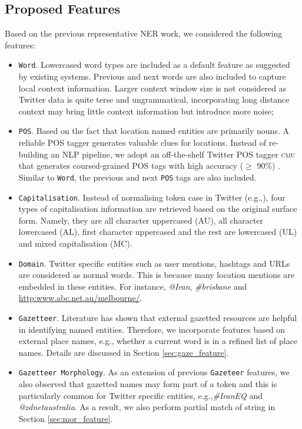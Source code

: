 \documentclass[11pt]{article}
\newcommand{\eg}{e.g.,\xspace}
\newcommand{\myex}[1]{\textit{#1}}
\newcommand{\cmu}{\textsc{cmu}\xspace}
\newcommand{\feature}[1]{\texttt{#1}\xspace}
\newcommand{\myurl}[1]{{\footnotesize\url{#1}}}
\newcommand{\secref}[2][]{Section#1 \ref{#2}}
\begin{document}
\subsection{Proposed Features}
\label{sec:basic_feature}

Based on the previous representative NER work, we considered the following features:

\begin{itemize}
    \item \feature{Word}. Lowercased word types are included as a default feature as suggested by existing systems. Previous and next words are also included to capture local context information. Larger context window size is not considered as Twitter data is quite terse and ungrammatical, incorporating long distance context may bring little context information but introduce more noise;
    \item \feature{POS}. Based on the fact that location named entities are primarily nouns. A reliable POS tagger generates valuable clues for locations. Instead of re-building an NLP pipeline, we adopt an off-the-shelf Twitter POS tagger \cmu that generates coursed-grained POS tags with high accuracy ($\ge$ 90\%) \cite{naacl13owop}. Similar to \feature{Word}, the previous and next \feature{POS} tags are also included.
    \item \feature{Capitalisation}. Instead of normalising token case in Twitter (\eg \cite{emnlp11ritt}), four types of capitalisation information are retrieved based on the original surface form. Namely, they are all character uppercased (AU), all character lowercased (AL), first character uppercased and the rest are lowercased (UL) and mixed capitalisation (MC). 
    \item \feature{Domain}. Twitter specific entities such as user mentions, hashtags and URLs are considered as normal words. This is because many location mentions are embedded in these entities. For instance, \myex{@Iran}, \myex{\#brisbane} and \myurl{http:www.abc.net.au/melbourne/}.
    \item \feature{Gazetteer}. Literature has shown that external gazetted resources are helpful in identifying named entities. Therefore, we incorporate features based on external place names, \eg whether a current word is in a refined list of place names. Details are discussed in \secref{sec:gaze_feature}.
    \item \feature{Gazetteer Morphology}. As an extension of previous \feature{Gazeteer} features, we also observed that gazetted names may form part of a token and this is particularly common for Twitter specific entities, \eg \myex{\#IranEQ} and \myex{@zdnetaustralia}. As a result, we also perform partial match of string in \secref{sec:mor_feature}.
\end{itemize}
\end{document}
